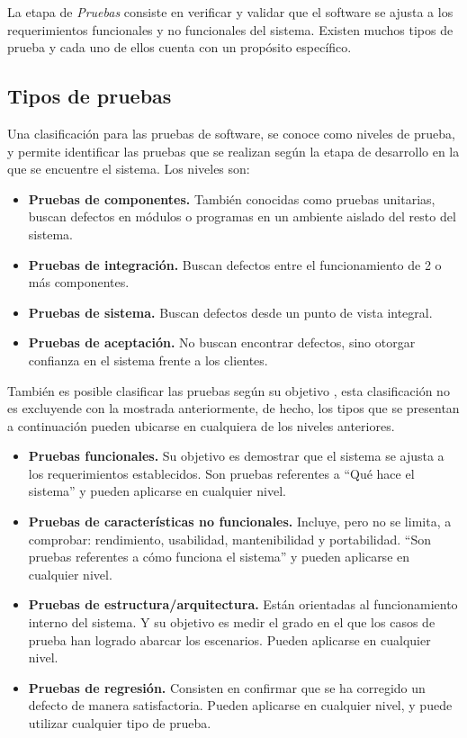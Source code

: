 La etapa de {\it Pruebas} consiste en verificar y validar que el software se ajusta a los requerimientos funcionales y no funcionales del sistema. Existen muchos tipos de prueba y cada uno de ellos cuenta con un propósito específico.

\subsection{Tipos de pruebas}

	Una clasificación para las pruebas de software, se conoce como niveles de prueba, y permite identificar las pruebas que se realizan según la etapa de desarrollo en la que se encuentre el sistema. Los niveles son:
\begin{itemize}
	\item {\bf Pruebas de componentes.} También conocidas como pruebas unitarias, buscan defectos en módulos o programas en un ambiente aislado del resto del sistema.
	\item {\bf Pruebas de integración.} Buscan defectos entre el funcionamiento de 2 o más componentes.
	\item {\bf Pruebas de sistema.} Buscan defectos desde un punto de vista integral.
	\item {\bf Pruebas de aceptación.} No buscan encontrar defectos, sino otorgar confianza en el sistema frente a los clientes.
\end{itemize}

\vspace{1cm}
	También es posible clasificar las pruebas según su objetivo \cite{istqb2011}, esta clasificación no es excluyende con la mostrada anteriormente, de hecho, los tipos que se presentan a continuación pueden ubicarse en cualquiera de los niveles anteriores.

\begin{itemize}
	\item {\bf Pruebas funcionales.} Su objetivo es demostrar que el sistema se ajusta a los requerimientos establecidos. Son pruebas referentes a ``Qué hace el sistema'' y pueden aplicarse en cualquier nivel.
	\item {\bf Pruebas de características no funcionales.} Incluye, pero no se limita, a comprobar: rendimiento, usabilidad, mantenibilidad y portabilidad. ``Son pruebas referentes a cómo funciona el sistema'' y pueden aplicarse en cualquier nivel.	
	\item {\bf Pruebas de estructura/arquitectura.} Están orientadas al funcionamiento interno del sistema. Y su objetivo es medir el grado en el que los casos de prueba han logrado abarcar los escenarios. Pueden aplicarse en cualquier nivel.
	\item {\bf Pruebas de regresión.} Consisten en confirmar que se ha corregido un defecto de manera satisfactoria. Pueden aplicarse en cualquier nivel, y puede utilizar cualquier tipo de prueba.
\end{itemize}

